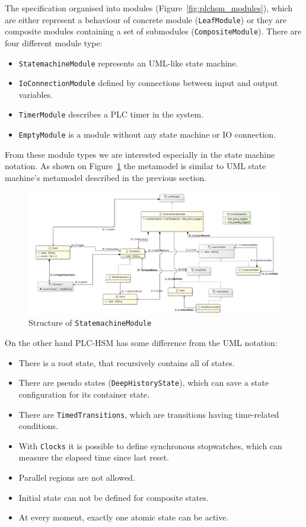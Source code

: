 The specification organised into modules (Figure~\ref{fig:plchsm_modules}), which are either represent a behaviour of concrete module (\texttt{LeafModule}) or they are composite modules containing a set of submodules (\texttt{CompositeModule}). There are four different module type:

\begin{itemize}
	\item \texttt{StatemachineModule} represents an UML-like state machine.
	\item \texttt{IoConnectionModule} defined by connections between input and output variables.
	\item \texttt{TimerModule} describes a PLC timer in the system.
	\item \texttt{EmptyModule} is a module without any state machine or IO connection.
\end{itemize}

From these module types we are interested especially in the state machine notation. As shown on Figure~\ref{fig:plchsm_statemachine} the metamodel is similar to UML state machine's metamodel described in the previous section.

\begin{figure}[htp]
\centering
\includegraphics[scale=0.5]{figures/plchsm_statemachine}
\caption{Structure of \texttt{StatemachineModule}}
\label{fig:plchsm_statemachine}
\end{figure}

On the other hand PLC-HSM has some difference from the UML notation:

\begin{itemize}
	\item There is a root state, that recursively contains all of states.
	\item There are pseudo states (\texttt{DeepHistoryState}), which can save a state configuration for its container state.
	\item There are \texttt{TimedTransitions}, which are transitions having time-related conditions.
	\item With \texttt{Clocks} it is possible to define synchronous stopwatches, which can measure the elapsed time since last reset.
	\item Parallel regions are not allowed.
	\item Initial state can not be defined for composite states.
	\item At every moment, exactly one atomic state can be active. 
\end{itemize}

